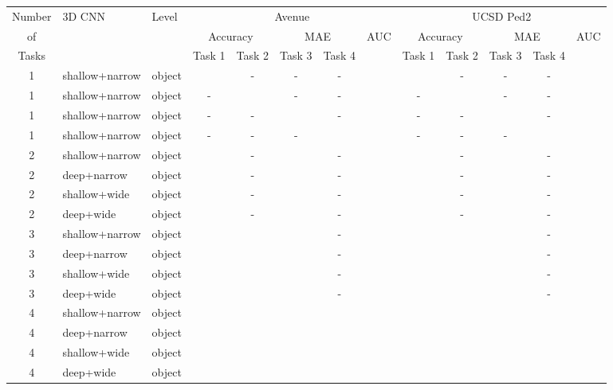\documentclass[final]{cvpr}
\begin{document}
\begin{table*}[t]
\setlength\tabcolsep{5.0pt}
\small{
\begin{center}
\begin{tabular}{|c|l|l|c|c|c|c|c|c|c|c|c|c|}
\hline
Number & \multirow{3}{*}{3D CNN}      & \multirow{3}{*}{Level}       &  \multicolumn{5}{|c|}{Avenue} & \multicolumn{5}{|c|}{UCSD Ped2}    \\
\cline{4-13}                    
of & & &  \multicolumn{2}{|c|}{Accuracy}   &   \multicolumn{2}{|c|}{MAE} & \multirow{2}{*}{AUC} & \multicolumn{2}{|c|}{Accuracy}   &   \multicolumn{2}{|c|}{MAE} &  \multirow{2}{*}{AUC}  \\

\cline{4-7}  \cline{9-12} 
Tasks &           &       & Task 1 & Task 2 & Task 3 & Task 4 &  & Task 1 & Task 2 & Task 3 & Task 4 &  \\
\hline                 
1 & shallow+narrow & object &  & - & - & - &  &  & -  & - & - & \\
1 & shallow+narrow & object &  -     &  & - & - &      & -  &  & - & - & \\
1 & shallow+narrow & object &  -     & -  &  & - &    & - & - &  & - &  \\
1 & shallow+narrow & object &  -     & -  & -  &  &  & - & - & - & &  \\
\hline 
2 & shallow+narrow & object &  & - &  & - &  &  & - &  & -  &  \\
2 & deep+narrow    & object &  & - &  & - &  &  & - &  & -  &  \\
2 & shallow+wide   & object &  & - &  & - &  &  & - &  & -  &   \\
2 & deep+wide      & object &  & - &  & - &  &  & - &  & - &    \\
\hline
3 & shallow+narrow & object &  &  &  & - &  &  &  &  & - &  \\
3 & deep+narrow    & object &  &  &  & - &  &  &  &  & - &  \\ 
3 & shallow+wide   & object &  &  &  & - &  &  &  &  & - &  \\ 
3 & deep+wide      & object &  &  &  & - &  &  &  &  & -  &  \\ 
\hline
4 & shallow+narrow & object &  &  &  &  &  &  &  &  &  &  \\ 
4 & deep+narrow    & object &  &  &  &  &  &  &  &  &  &   \\ 
4 & shallow+wide   & object &  &  &  &  &  &  &  &  &  &   \\  
4 & deep+wide      & object &  &  &  &  &  &  &  &  &  &  \\

\end{tabular}
\end{center}}
\end{table*}
\end{document}
